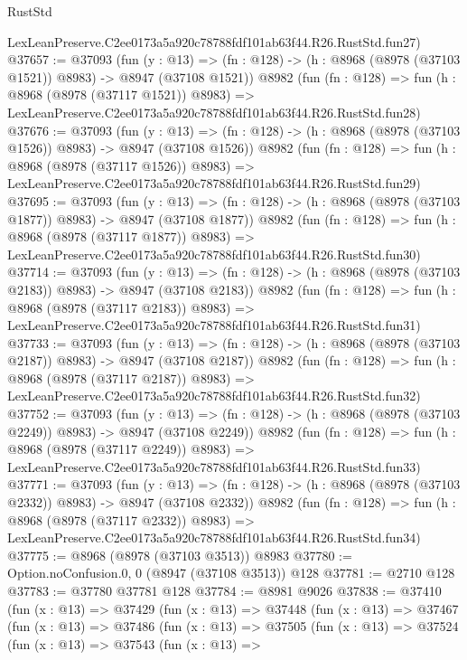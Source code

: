 \begin{lexlean}{RustStd}
\begin{coremodule}
    LexLeanPreserve.C2ee0173a5a920c78788fdf101ab63f44.R26.RustStd.fun27)
@37657 := @37093
    (fun (y : @13) =>
    (fn : @128) -> (h : @8968 (@8978 (@37103 @1521)) @8983) -> @8947 (@37108 @1521))
    @8982
    (fun (fn : @128) =>
    fun (h : @8968 (@8978 (@37117 @1521)) @8983) =>
    LexLeanPreserve.C2ee0173a5a920c78788fdf101ab63f44.R26.RustStd.fun28)
@37676 := @37093
    (fun (y : @13) =>
    (fn : @128) -> (h : @8968 (@8978 (@37103 @1526)) @8983) -> @8947 (@37108 @1526))
    @8982
    (fun (fn : @128) =>
    fun (h : @8968 (@8978 (@37117 @1526)) @8983) =>
    LexLeanPreserve.C2ee0173a5a920c78788fdf101ab63f44.R26.RustStd.fun29)
@37695 := @37093
    (fun (y : @13) =>
    (fn : @128) -> (h : @8968 (@8978 (@37103 @1877)) @8983) -> @8947 (@37108 @1877))
    @8982
    (fun (fn : @128) =>
    fun (h : @8968 (@8978 (@37117 @1877)) @8983) =>
    LexLeanPreserve.C2ee0173a5a920c78788fdf101ab63f44.R26.RustStd.fun30)
@37714 := @37093
    (fun (y : @13) =>
    (fn : @128) -> (h : @8968 (@8978 (@37103 @2183)) @8983) -> @8947 (@37108 @2183))
    @8982
    (fun (fn : @128) =>
    fun (h : @8968 (@8978 (@37117 @2183)) @8983) =>
    LexLeanPreserve.C2ee0173a5a920c78788fdf101ab63f44.R26.RustStd.fun31)
@37733 := @37093
    (fun (y : @13) =>
    (fn : @128) -> (h : @8968 (@8978 (@37103 @2187)) @8983) -> @8947 (@37108 @2187))
    @8982
    (fun (fn : @128) =>
    fun (h : @8968 (@8978 (@37117 @2187)) @8983) =>
    LexLeanPreserve.C2ee0173a5a920c78788fdf101ab63f44.R26.RustStd.fun32)
@37752 := @37093
    (fun (y : @13) =>
    (fn : @128) -> (h : @8968 (@8978 (@37103 @2249)) @8983) -> @8947 (@37108 @2249))
    @8982
    (fun (fn : @128) =>
    fun (h : @8968 (@8978 (@37117 @2249)) @8983) =>
    LexLeanPreserve.C2ee0173a5a920c78788fdf101ab63f44.R26.RustStd.fun33)
@37771 := @37093
    (fun (y : @13) =>
    (fn : @128) -> (h : @8968 (@8978 (@37103 @2332)) @8983) -> @8947 (@37108 @2332))
    @8982
    (fun (fn : @128) =>
    fun (h : @8968 (@8978 (@37117 @2332)) @8983) =>
    LexLeanPreserve.C2ee0173a5a920c78788fdf101ab63f44.R26.RustStd.fun34)
@37775 := @8968 (@8978 (@37103 @3513)) @8983
@37780 := Option.noConfusion.{0, 0} (@8947 (@37108 @3513)) @128
@37781 := @2710 @128
@37783 := @37780 @37781 @128
@37784 := @8981 @9026
@37838 := @37410
    (fun (x : @13) =>
    @37429
      (fun (x : @13) =>
      @37448
        (fun (x : @13) =>
        @37467
          (fun (x : @13) =>
          @37486
            (fun (x : @13) =>
            @37505
              (fun (x : @13) =>
              @37524
                (fun (x : @13) =>
                @37543
                  (fun (x : @13) =>

\end{coremodule}
\end{lexlean}
